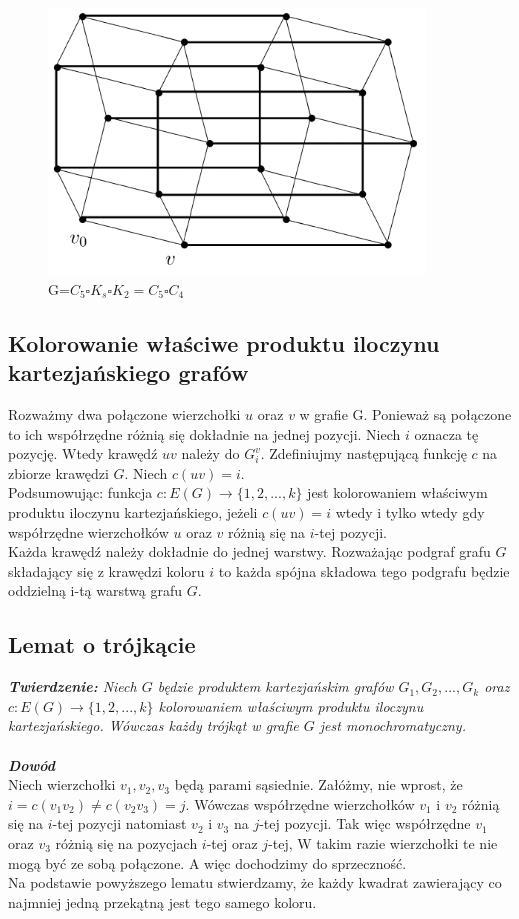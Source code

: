 \documentclass[12pt,a4paper,titlepage]{article}
\begin{document}
\begin{figure}
\centering
\includegraphics[width = 10cm]{rys1.png}
\caption{G=$C_5 \square K_s \square K_2 = C_5 \square C_4$}
\end{figure}

\newpage
\subsection{Kolorowanie właściwe produktu iloczynu kartezjańskiego grafów}
Rozważmy dwa połączone wierzchołki $u$ oraz $v$ w grafie G. Ponieważ są połączone to ich współrzędne różnią się dokładnie na jednej pozycji. Niech $i$ oznacza tę pozycję. Wtedy krawędź $uv$ należy do $G_i^v$. Zdefiniujmy następującą funkcję $c$ na zbiorze krawędzi $G$. Niech $c(uv) = i$.\\
Podsumowując: funkcja $c: E(G) \rightarrow \{1,2,...,k\}$ jest kolorowaniem właściwym produktu iloczynu kartezjańskiego, jeżeli $c(uv) = i $ wtedy i tylko wtedy gdy współrzędne wierzchołków $u$ oraz $v$ różnią się na $i$-tej pozycji.\\
Każda krawędź należy dokładnie do jednej warstwy. Rozważając podgraf grafu $G$ składający się z krawędzi koloru $i$ to każda spójna składowa tego podgrafu będzie oddzielną i-tą warstwą grafu $G$.
\subsection{Lemat o trójkącie}
\textit{\textbf{Twierdzenie:} Niech $G$ będzie produktem kartezjańskim grafów $G_1, G_2, ... , G_k$ oraz $c: E(G) \rightarrow \{1,2,...,k\}$ kolorowaniem właściwym produktu iloczynu kartezjańskiego. Wówczas każdy trójkąt w grafie $G$ jest monochromatyczny.}\\
\\
\textit{\textbf{Dowód}}\\
Niech wierzchołki $v_1, v_2, v_3$ będą parami sąsiednie. Załóżmy, nie wprost, że $i=c(v_1 v_2 ) \neq c(v_2 v_3)=j$. Wówczas współrzędne wierzchołków $v_1$ i $v_2$ różnią się na $i$-tej pozycji natomiast $v_2$ i $v_3$ na $j$-tej pozycji. Tak więc współrzędne $v_1$ oraz $v_3$ różnią się na pozycjach $i$-tej oraz $j$-tej, W takim razie wierzchołki te nie mogą być ze sobą połączone. A więc dochodzimy do sprzeczność.\\
Na podstawie powyższego lematu stwierdzamy, że każdy kwadrat zawierający co najmniej jedną przekątną jest tego samego koloru.\\
\end{document}
